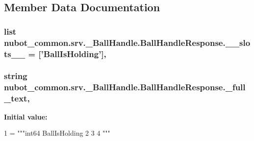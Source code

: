 \subsection{Member Data Documentation}
\hypertarget{classnubot__common_1_1srv_1_1__BallHandle_1_1BallHandleResponse_af70beade80c0a917ce0f6cbe4bc041a7}{
\subsubsection[{\-\_\-\-\_\-slots\-\_\-\-\_\-}]{\setlength{\rightskip}{0pt plus 5cm}list nubot\-\_\-common.\-srv.\-\_\-\-Ball\-Handle.\-Ball\-Handle\-Response.\-\_\-\-\_\-slots\-\_\-\-\_\- = \mbox{[}'{\bf Ball\-Is\-Holding}'\mbox{]}\hspace{0.3cm}{\ttfamily [static]}, {\ttfamily [private]}}}\label{classnubot__common_1_1srv_1_1__BallHandle_1_1BallHandleResponse_af70beade80c0a917ce0f6cbe4bc041a7}
\hypertarget{classnubot__common_1_1srv_1_1__BallHandle_1_1BallHandleResponse_ae76cc57bba139de71167124fe3789dd6}{
\subsubsection[{\-\_\-full\-\_\-text}]{\setlength{\rightskip}{0pt plus 5cm}string nubot\-\_\-common.\-srv.\-\_\-\-Ball\-Handle.\-Ball\-Handle\-Response.\-\_\-full\-\_\-text\hspace{0.3cm}{\ttfamily [static]}, {\ttfamily [private]}}}\label{classnubot__common_1_1srv_1_1__BallHandle_1_1BallHandleResponse_ae76cc57bba139de71167124fe3789dd6}
{\bfseries Initial value\-:}
\begin{DoxyCode}
1 = \textcolor{stringliteral}{"""int64 BallIsHolding}
2 \textcolor{stringliteral}{}
3 \textcolor{stringliteral}{}
4 \textcolor{stringliteral}{"""}
\end{DoxyCode}
